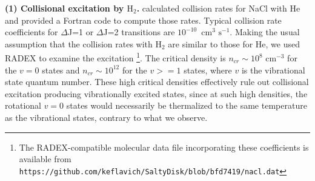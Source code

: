 \documentclass[12pt]{article}
\newcommand{\hh}{\ensuremath{\textrm{H}_{2}}\xspace}			%
\newcommand{\pers}{\ensuremath{\mathrm{s}^{-1}}\xspace}
\newcommand{\kms}{\textrm{km~s}\ensuremath{^{-1}}\xspace}	%
\newcommand{\percc}{\ensuremath{\textrm{cm}^{-3}}\xspace}
\begin{document}
\par{\textbf{(1) Collisional excitation by \hh.}} 
%
%
\cite{Quintana-Lacaci2016a} calculated collision rates for NaCl with He and
provided a Fortran code to compute those rates.  Typical collision rate
coefficients for \hbox{$\Delta$J=1} or \hbox{$\Delta$J=2} transitions are
$10^{-10}$~cm$^3$ \pers.  Making the usual assumption that the collision rates
with \hh are similar to those for He, we used RADEX \cite{van-der-Tak2007a} to
examine the excitation \footnote{The
RADEX-compatible molecular data
file incorporating these coefficients is available from
\texttt{https://github.com/keflavich/SaltyDisk/blob/bfd7419/nacl.dat}}.
The critical density is $n_{cr}\sim10^8$ \percc for the $v=0$
states and $n_{cr}\sim10^{12}$ for the $v>=1$ states, where $v$ is the
vibrational state quantum number.  These high critical densities effectively
rule out collisional excitation producing vibrationally excited states,
since at such high densities, the rotational $v=0$ states would necessarily
be thermalized to the same temperature as the vibrational states, contrary
to what we observe.
\end{document}
